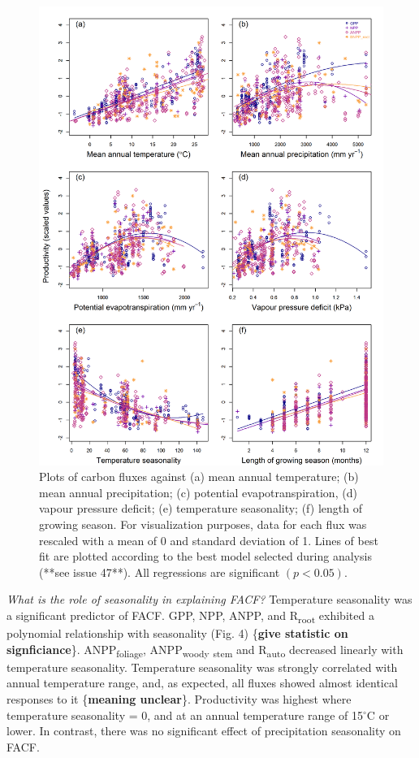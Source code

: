 \documentclass[]{article}
\begin{document}
\begin{figure}[H]
\includegraphics[width=1\linewidth]{combined_plots} \caption{Plots of carbon fluxes against (a) mean annual temperature; (b) mean annual precipitation; (c) potential evapotranspiration, (d) vapour pressure deficit; (e) temperature seasonality; (f) length of growing season. For visualization purposes, data for each flux was rescaled with a mean of 0 and standard deviation of 1. Lines of best fit are plotted according to the best model selected during analysis (**see issue 47**). All regressions are significant $(p<0.05)$.}\label{fig:unnamed-chunk-8}
\end{figure}

\emph{What is the role of seasonality in explaining FACF?} Temperature
seasonality was a significant predictor of FACF. GPP, NPP, ANPP, and
R\textsubscript{root} exhibited a polynomial relationship with
seasonality (Fig. 4) \{\textbf{give statistic on signficiance}\}.
ANPP\textsubscript{foliage}, ANPP\textsubscript{woody}
\textsubscript{stem} and R\textsubscript{auto} decreased linearly with
temperature seasonality. Temperature seasonality was strongly correlated
with annual temperature range, and, as expected, all fluxes showed
almost identical responses to it \{\textbf{meaning unclear}\}.
Productivity was highest where temperature seasonality = 0, and at an
annual temperature range of 15\(^\circ\)C or lower. In contrast, there
was no significant effect of precipitation seasonality on FACF.
\end{document}
